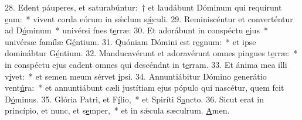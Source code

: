 28. Edent páuperes, et saturabúntur:~† et laudábunt Dóminum qui requírunt \uline{e}um:~* vivent corda eórum in sǽclum s\uline{ǽ}culi.
29. Reminiscéntur et converténtur ad D\uline{ó}minum~* univérsi fnes t\uline{e}rræ:
30. Et adorábunt in conspéctu \uline{e}jus~* univérsæ famílæ G\uline{é}ntium.
31. Quóniam Dómini est r\uline{e}gnum:~* et ipse dominábtur G\uline{é}ntium.
32. Manducavérunt et adoravérunt omnes pingues t\uline{e}rræ:~* in conspéctu ejus cadent omnes qui descéndnt in t\uline{e}rram.
33. Et ánima mea illi v\uline{i}vet:~* et semen meum sérvet \uline{i}psi.
34. Annuntiábitur Dómino generátio vent\uline{ú}ra:~* et annuntiábunt cæli justítiam ejus pópulo qui nascétur, quem fcit D\uline{ó}minus.
35. Glória Patri, et F\uline{í}lio,~* et Spiríti S\uline{a}ncto.
36. Sicut erat in princípio, et nunc, et s\uline{e}mper,~* et in sǽcula sæculrum. \uline{A}men.
